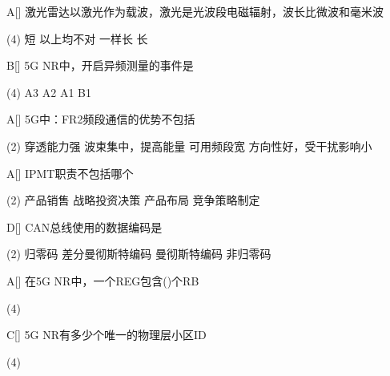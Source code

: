 \begin{choice}{A}[]
    激光雷达以激光作为载波，激光是光波段电磁辐射，波长比微波和毫米波
    \begin{tasks}(4)
        \task 短
        \task 以上均不对
        \task 一样长
        \task 长
    \end{tasks}
\end{choice}

\begin{choice}{B}[]
    5G NR中，开启异频测量的事件是
    \begin{tasks}(4)
        \task A3
        \task A2
        \task A1
        \task B1
    \end{tasks}
\end{choice}


\begin{choice}{A}[]
    5G中：FR2频段通信的优势不包括
    \begin{tasks}(2)
        \task 穿透能力强
        \task 波束集中，提高能量
        \task 可用频段宽
        \task 方向性好，受干扰影响小
    \end{tasks}
\end{choice}



\begin{choice}{A}[]
    IPMT职责不包括哪个
    \begin{tasks}(2)
        \task 产品销售
        \task 战略投资决策
        \task 产品布局
        \task 竞争策略制定
    \end{tasks}
\end{choice}



\begin{choice}{D}[]
    CAN总线使用的数据编码是
    \begin{tasks}(2)
        \task 归零码
        \task 差分曼彻斯特编码
        \task 曼彻斯特编码
        \task 非归零码
    \end{tasks}
\end{choice}




\begin{choice}{A}[]
    在5G NR中，一个REG包含(\quad)个RB
    \begin{tasks}(4)
    \end{tasks}
\end{choice}

\begin{choice}{C}[]
    5G NR有多少个唯一的物理层小区ID
    \begin{tasks}(4)
    \end{tasks}
\end{choice}

